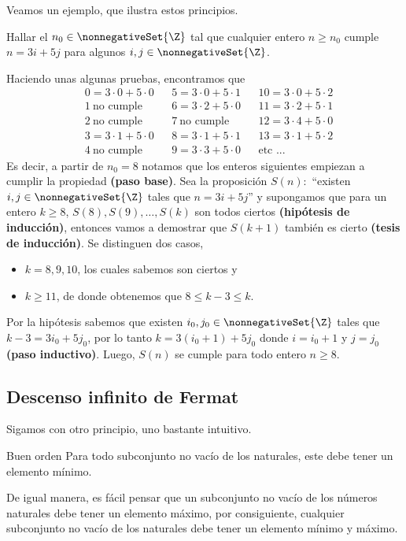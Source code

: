 Veamos un ejemplo, que ilustra estos principios.
\begin{example}
    Hallar el $n_0 \in \nonnegativeSet{\Z}$ tal que cualquier entero $n \geq n_0$ cumple $n = 3i + 5j$ para algunos
    $i,j \in \nonnegativeSet{\Z}$.
\end{example}
\begin{solution}
    Haciendo unas algunas pruebas, encontramos que
    \begin{align*}
        &0 = 3\cdot 0 + 5\cdot 0 && 5 = 3\cdot 0 + 5\cdot 1 && 10 = 3\cdot 0 + 5\cdot 2\\
        &1\ \text{no cumple} && 6 = 3\cdot 2 + 5\cdot 0 && 11 = 3\cdot 2 + 5\cdot 1\\
        &2\ \text{no cumple} && 7\ \text{no cumple} && 12 = 3\cdot 4 + 5\cdot 0\\
        &3 = 3\cdot 1 + 5\cdot 0 && 8 = 3\cdot 1 + 5\cdot 1 && 13 = 3\cdot 1 + 5 \cdot 2\\
        &4\ \text{no cumple} && 9 = 3\cdot 3 + 5\cdot 0 && \text{etc ...}
    \end{align*}
    Es decir, a partir de $n_0 = 8$ notamos que los enteros siguientes empiezan a cumplir la propiedad \textbf{\small(paso base)}.
    Sea la proposición $S(n) : $ ``existen $i,j \in \nonnegativeSet{\Z}$ tales que $n = 3i + 5j$'' y supongamos que
    para un entero $k \geq 8$, $S(8), S(9), \ldots, S(k)$ son todos ciertos \textbf{\small(hipótesis de inducción)},
    entonces vamos a demostrar que $S(k + 1)$ también es cierto \textbf{\small(tesis de inducción)}.
    Se distinguen dos casos,
    \begin{itemize}
        \item $k = 8,9,10$, los cuales sabemos son ciertos y
        \item $k \geq 11$, de donde obtenemos que $8 \leq k - 3 \leq k$.
    \end{itemize}
    Por la hipótesis sabemos que existen $i_0,j_0 \in \nonnegativeSet{\Z}$ tales que $k - 3 = 3 i_0 + 5 j_0$, por lo tanto
    $k = 3 (i_0 + 1) + 5j_0$ donde $i = i_0 + 1$ y $j = j_0$ \textbf{\small(paso inductivo)}.
    Luego, $S(n)$ se cumple para todo entero $n \geq 8$.
\end{solution}


\subsection{Descenso infinito de Fermat}

Sigamos con otro principio, uno bastante intuitivo.
\begin{principle.box}{Buen orden}{}
    Para todo subconjunto no vacío de los naturales, este debe tener un elemento mínimo.
\end{principle.box}
De igual manera, es fácil pensar que un subconjunto no vacío de los números naturales debe tener un elemento máximo,
por consiguiente, cualquier subconjunto no vacío de los naturales debe tener un elemento mínimo y máximo.

